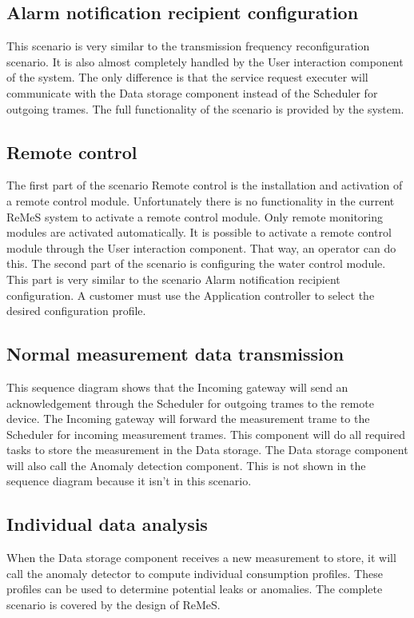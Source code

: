 \subsection{Alarm notification recipient configuration}
This scenario is very similar to the transmission frequency reconfiguration scenario. It is also almost completely handled by the
User interaction component of the system. The only difference is that the service request executer will communicate with the
Data storage component instead of the Scheduler for outgoing trames. The full functionality of the scenario is provided by the system.
\subsection{Remote control}
The first part of the scenario Remote control is the installation and activation of a remote control module. Unfortunately there is
no functionality in the current ReMeS system to activate a remote control module. Only remote monitoring modules are activated automatically.
It is possible to activate a remote control module through the User interaction component. That way, an operator can do this.
The second part of the scenario is configuring the water control module. This part is very similar to the scenario Alarm notification
recipient configuration. A customer must use the Application controller to select the desired configuration profile.
\subsection{Normal measurement data transmission}
This sequence diagram shows that the Incoming gateway will send an acknowledgement through the Scheduler for outgoing trames to the
remote device. The Incoming gateway will forward the measurement trame to the Scheduler for incoming measurement trames. This component
will do all required tasks to store the measurement in the Data storage. The Data storage component will also call the Anomaly detection
component. This is not shown in the sequence diagram because it isn't in this scenario.
\subsection{Individual data analysis}
When the Data storage component receives a new measurement to store, it will call the anomaly detector to compute individual consumption
profiles. These profiles can be used to determine potential leaks or anomalies. The complete scenario is covered by the design of ReMeS.
